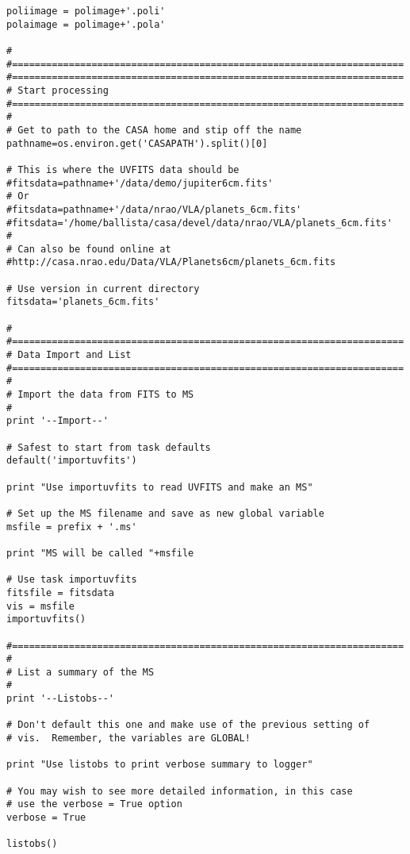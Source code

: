 \begin{verbatim}
poliimage = polimage+'.poli'
polaimage = polimage+'.pola'

#
#=====================================================================
#=====================================================================
# Start processing
#=====================================================================
#
# Get to path to the CASA home and stip off the name
pathname=os.environ.get('CASAPATH').split()[0]

# This is where the UVFITS data should be
#fitsdata=pathname+'/data/demo/jupiter6cm.fits'
# Or
#fitsdata=pathname+'/data/nrao/VLA/planets_6cm.fits'
#fitsdata='/home/ballista/casa/devel/data/nrao/VLA/planets_6cm.fits'
#
# Can also be found online at
#http://casa.nrao.edu/Data/VLA/Planets6cm/planets_6cm.fits

# Use version in current directory
fitsdata='planets_6cm.fits'

#
#=====================================================================
# Data Import and List
#=====================================================================
#
# Import the data from FITS to MS
#
print '--Import--'

# Safest to start from task defaults
default('importuvfits')

print "Use importuvfits to read UVFITS and make an MS"

# Set up the MS filename and save as new global variable
msfile = prefix + '.ms'

print "MS will be called "+msfile

# Use task importuvfits
fitsfile = fitsdata
vis = msfile
importuvfits()

#=====================================================================
#
# List a summary of the MS
#
print '--Listobs--'

# Don't default this one and make use of the previous setting of
# vis.  Remember, the variables are GLOBAL!

print "Use listobs to print verbose summary to logger"

# You may wish to see more detailed information, in this case
# use the verbose = True option
verbose = True

listobs()


\end{verbatim}
